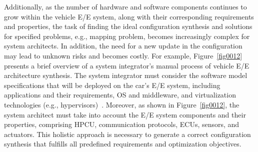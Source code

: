     Additionally, as the number of hardware and software components continues to grow within the vehicle E/E system, along with their corresponding requirements and properties, the task of finding the ideal configuration synthesis and solutions for specified problems, e.g., mapping problem, becomes increasingly complex for system architects. In addition, the need for a new update in the configuration may lead to unknown risks and becomes costly. For example, Figure~\ref{fig0012} presents a brief overview of a system integrator's manual process of vehicle E/E architecture synthesis. The system integrator must consider the software model specifications that will be deployed on the car's E/E system, including applications and their requirements, OS and middleware, and virtualization technologies (e.g., hypervisors)~\cite{askaripoor2022architecture}. Moreover, as shown in Figure~\ref{fig0012}, the system architect must take into account the E/E system components and their properties, comprising HPCU, communication protocols, ECUs, sensors, and actuators. This holistic approach is necessary to generate a correct configuration synthesis that fulfills all predefined requirements and optimization objectives. 
    
    
